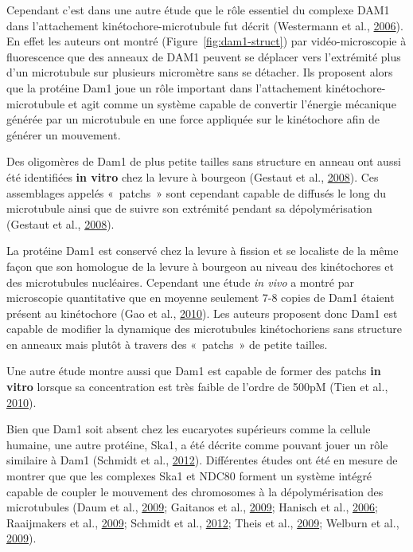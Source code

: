 \documentclass[12pt,a4paper,twoside,openright]{book}
\begin{document}
Cependant c'est dans une autre étude que le rôle essentiel du complexe
DAM1 dans l'attachement kinétochore-microtubule fut décrit (Westermann
et al., \protect\hyperlink{ref-Westermann2006}{2006}). En effet les
auteurs ont montré (Figure~\ref{fig:dam1-struct}) par vidéo-microscopie
à fluorescence que des anneaux de DAM1 peuvent se déplacer vers
l'extrémité plus d'un microtubule sur plusieurs micromètre sans se
détacher. Ils proposent alors que la protéine Dam1 joue un rôle
important dans l'attachement kinétochore-microtubule et agit comme un
système capable de convertir l'énergie mécanique générée par un
microtubule en une force appliquée sur le kinétochore afin de générer un
mouvement.

Des oligomères de Dam1 de plus petite tailles sans structure en anneau
ont aussi été identifiées \textbf{in vitro} chez la levure à bourgeon
(Gestaut et al., \protect\hyperlink{ref-Gestaut2008}{2008}). Ces
assemblages appelés «~patchs~» sont cependant capable de diffusés le
long du microtubule ainsi que de suivre son extrémité pendant sa
dépolymérisation (Gestaut et al.,
\protect\hyperlink{ref-Gestaut2008}{2008}).

La protéine Dam1 est conservé chez la levure à fission et se localiste
de la même façon que son homologue de la levure à bourgeon au niveau des
kinétochores et des microtubules nucléaires. Cependant une étude
\emph{in vivo} a montré par microscopie quantitative que en moyenne
seulement 7-8 copies de Dam1 étaient présent au kinétochore (Gao et al.,
\protect\hyperlink{ref-Gao2010}{2010}). Les auteurs proposent donc Dam1
est capable de modifier la dynamique des microtubules kinétochoriens
sans structure en anneaux mais plutôt à travers des «~patchs~» de petite
tailles.

Une autre étude montre aussi que Dam1 est capable de former des patchs
\textbf{in vitro} lorsque sa concentration est très faible de l'ordre de
500pM (Tien et al., \protect\hyperlink{ref-Tien2010}{2010}).

Bien que Dam1 soit absent chez les eucaryotes supérieurs comme la
cellule humaine, une autre protéine, Ska1, a été décrite comme pouvant
jouer un rôle similaire à Dam1 (Schmidt et al.,
\protect\hyperlink{ref-Schmidt2012}{2012}). Différentes études ont été
en mesure de montrer que que les complexes Ska1 et NDC80 forment un
système intégré capable de coupler le mouvement des chromosomes à la
dépolymérisation des microtubules (Daum et al.,
\protect\hyperlink{ref-Daum2009}{2009}; Gaitanos et al.,
\protect\hyperlink{ref-Gaitanos2009}{2009}; Hanisch et al.,
\protect\hyperlink{ref-Hanisch2006}{2006}; Raaijmakers et al.,
\protect\hyperlink{ref-Raaijmakers2009}{2009}; Schmidt et al.,
\protect\hyperlink{ref-Schmidt2012}{2012}; Theis et al.,
\protect\hyperlink{ref-Theis2009}{2009}; Welburn et al.,
\protect\hyperlink{ref-Welburn2009}{2009}).
\end{document}
